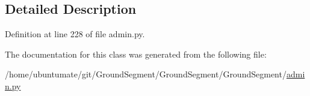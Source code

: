 \subsection{Detailed Description}


Definition at line 228 of file admin.\+py.



The documentation for this class was generated from the following file\+:\begin{DoxyCompactItemize}
\item 
/home/ubuntumate/git/\+Ground\+Segment/\+Ground\+Segment/\+Ground\+Segment/\hyperlink{admin_8py}{admin.\+py}\end{DoxyCompactItemize}
